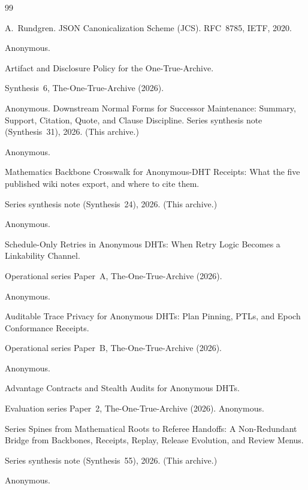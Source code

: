 \documentclass[11pt]{article}
\begin{document}
\begin{thebibliography}{99}\small


A.~Rundgren.
\newblock JSON Canonicalization Scheme (JCS).
\newblock RFC~8785, IETF, 2020.

Anonymous.

\newblock Artifact and Disclosure Policy for the One-True-Archive.

\newblock Synthesis~6, The-One-True-Archive (2026).

Anonymous.
\newblock Downstream Normal Forms for Successor Maintenance: Summary, Support, Citation, Quote, and Clause Discipline.
\newblock Series synthesis note (Synthesis~31), 2026. (This archive.)

Anonymous.

\newblock Mathematics Backbone Crosswalk for Anonymous-DHT Receipts: What the five published wiki notes export, and where to cite them.

\newblock Series synthesis note (Synthesis~24), 2026. (This archive.)


Anonymous.

\newblock Schedule-Only Retries in Anonymous DHTs: When Retry Logic Becomes a Linkability Channel.

\newblock Operational series Paper~A, The-One-True-Archive (2026).

Anonymous.

\newblock Auditable Trace Privacy for Anonymous DHTs: Plan Pinning, PTLs, and Epoch Conformance Receipts.

\newblock Operational series Paper~B, The-One-True-Archive (2026).

Anonymous.

\newblock Advantage Contracts and Stealth Audits for Anonymous DHTs.

\newblock Evaluation series Paper~2, The-One-True-Archive (2026).
Anonymous.

\newblock Series Spines from Mathematical Roots to Referee Handoffs: A Non-Redundant Bridge from Backbones, Receipts, Replay, Release Evolution, and Review Menus.

\newblock Series synthesis note (Synthesis~55), 2026. (This archive.)

Anonymous.


\end{thebibliography}
\end{document}
